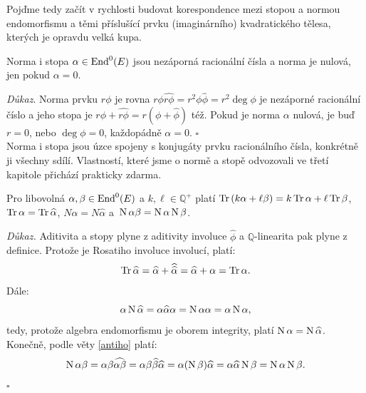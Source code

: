 \documentclass[12pt]{report}
\begin{document}
Pojďme tedy začít v rychlosti budovat korespondence mezi stopou a normou endomorfismu a těmi příslušící prvku (imaginárního) kvadratického tělesa, kterých je opravdu velká kupa.

\begin{veta}
Norma i stopa $\alpha \in \operatorname{End}^0 (E)$ jsou nezáporná racionální čísla a norma je nulová, jen pokud $\alpha = 0$.
\end{veta}
\noindent \textit{Důkaz}. Norma prvku $r \phi$ je rovna $r \phi \widehat{r \phi} = r^2 \phi \widehat{\phi} = r^2 \deg \phi$ je nezáporné racionální číslo a jeho stopa je $r \phi + \widehat{r \phi} = r (\phi+\widehat{\phi})$ též. Pokud je norma $\alpha$ nulová, je buď $r=0$, nebo $\deg \phi = 0$, každopádně $\alpha = 0$. \hfill $\square$\\

Norma i stopa jsou úzce spojeny s konjugáty prvku racionálního čísla, konkrétně ji všechny sdílí. Vlastností, které jsme o normě a stopě odvozovali ve třetí kapitole přichází prakticky zdarma.

\begin{veta}
Pro libovolná $\alpha,\beta \in \operatorname{End}^0 (E)$ a $k, \ell \in \mathbb{Q}^{+}$ platí $\operatorname{Tr} \left( k\alpha + \ell \beta \right) = k\operatorname{Tr} \alpha + \ell\operatorname{Tr} \beta$, $\operatorname{Tr} \alpha = \operatorname{Tr} \widehat{\alpha}$, $N \alpha = N \widehat{\alpha}$ a~$\operatorname{N} \alpha \beta = \operatorname{N} \alpha \operatorname{N} \beta$.
\end{veta}
\noindent \textit{Důkaz.} Aditivita a stopy plyne z aditivity involuce $\widehat{\phi}$ a $\mathbb{Q}$-linearita pak plyne z definice. Protože je Rosatiho involuce involucí, platí:
\begin{equation*}
\operatorname{Tr} \widehat{\alpha} = \widehat{\alpha} + \widehat{\widehat{\alpha}} = \widehat{\alpha} + \alpha = \operatorname{Tr} \alpha.
\end{equation*}
Dále:
\begin{equation*}
\alpha \operatorname{N} \widehat{\alpha} = \alpha \widehat{\alpha} \alpha = \operatorname{N} \alpha \alpha = \alpha \operatorname{N} \alpha,
\end{equation*} tedy, protože algebra endomorfismu je oborem integrity, platí $\operatorname{N} \alpha = \operatorname{N} \widehat{\alpha}$. Konečně, podle věty \ref{antiho} platí:
\begin{equation*}
\operatorname{N} \alpha \beta = \alpha \beta \widehat{\alpha \beta} = \alpha \beta \widehat{\beta} \widehat{\alpha} = \alpha (\operatorname{N} \beta) \widehat{\alpha} = \alpha \widehat{\alpha} \operatorname{N} \beta = \operatorname{N} \alpha \operatorname{N} \beta.
\end{equation*}
\hfill $\square$\\
\end{document}
